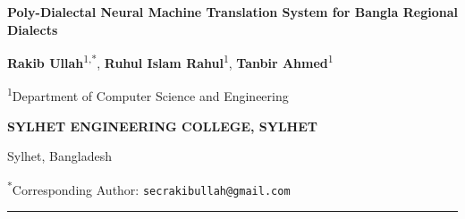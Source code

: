 \documentclass[12pt,a4paper]{article}
\begin{document}
\begin{titlepage}
    \centering
    \vspace*{0.5cm}
    
    {\Huge \textbf{Poly-Dialectal Neural Machine Translation System for Bangla Regional Dialects}\par}
    
    \vspace{1.2cm}
    
    {\Large \textbf{Rakib Ullah}\textsuperscript{1,*}, \textbf{Ruhul Islam Rahul}\textsuperscript{1}, \textbf{Tanbir Ahmed}\textsuperscript{1}\par}
    
    \vspace{0.6cm}
    
    {\large \textsuperscript{1}Department of Computer Science and Engineering\par}
    {\large \textbf{SYLHET ENGINEERING COLLEGE, SYLHET}\par}
    {\large Sylhet, Bangladesh\par}
    
    \vspace{0.4cm}
    
    {\large \textsuperscript{*}Corresponding Author: \texttt{secrakibullah@gmail.com}\par}
    
    \vspace{1.0cm}
    \rule{\linewidth}{0.5pt}
    \vspace{0.8cm}
    

\end{titlepage}
\end{document}
